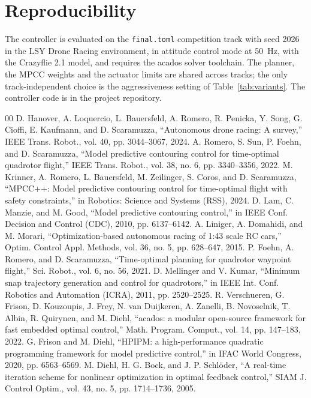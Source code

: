 \documentclass[conference]{IEEEtran}
\begin{document}
\appendices
\section{Reproducibility}
The controller is evaluated on the \texttt{final.toml} competition track with seed 2026 in the LSY Drone Racing environment, in attitude control mode at 50~Hz, with the Crazyflie 2.1 model, and requires the acados solver toolchain. The planner, the MPCC weights and the actuator limits are shared across tracks; the only track-independent choice is the aggressiveness setting of Table~\ref{tab:variants}. The controller code is in the project repository.

\begin{thebibliography}{00}
 D. Hanover, A. Loquercio, L. Bauersfeld, A. Romero, R. Penicka, Y. Song, G. Cioffi, E. Kaufmann, and D. Scaramuzza, ``Autonomous drone racing: A survey,'' IEEE Trans. Robot., vol. 40, pp. 3044--3067, 2024.
 A. Romero, S. Sun, P. Foehn, and D. Scaramuzza, ``Model predictive contouring control for time-optimal quadrotor flight,'' IEEE Trans. Robot., vol. 38, no. 6, pp. 3340--3356, 2022.
 M. Krinner, A. Romero, L. Bauersfeld, M. Zeilinger, S. Coros, and D. Scaramuzza, ``MPCC++: Model predictive contouring control for time-optimal flight with safety constraints,'' in Robotics: Science and Systems (RSS), 2024.
 D. Lam, C. Manzie, and M. Good, ``Model predictive contouring control,'' in IEEE Conf. Decision and Control (CDC), 2010, pp. 6137--6142.
 A. Liniger, A. Domahidi, and M. Morari, ``Optimization-based autonomous racing of 1:43 scale RC cars,'' Optim. Control Appl. Methods, vol. 36, no. 5, pp. 628--647, 2015.
 P. Foehn, A. Romero, and D. Scaramuzza, ``Time-optimal planning for quadrotor waypoint flight,'' Sci. Robot., vol. 6, no. 56, 2021.
 D. Mellinger and V. Kumar, ``Minimum snap trajectory generation and control for quadrotors,'' in IEEE Int. Conf. Robotics and Automation (ICRA), 2011, pp. 2520--2525.
 R. Verschueren, G. Frison, D. Kouzoupis, J. Frey, N. van Duijkeren, A. Zanelli, B. Novoselnik, T. Albin, R. Quirynen, and M. Diehl, ``acados: a modular open-source framework for fast embedded optimal control,'' Math. Program. Comput., vol. 14, pp. 147--183, 2022.
 G. Frison and M. Diehl, ``HPIPM: a high-performance quadratic programming framework for model predictive control,'' in IFAC World Congress, 2020, pp. 6563--6569.
 M. Diehl, H. G. Bock, and J. P. Schl\"oder, ``A real-time iteration scheme for nonlinear optimization in optimal feedback control,'' SIAM J. Control Optim., vol. 43, no. 5, pp. 1714--1736, 2005.

\end{thebibliography}
\end{document}
